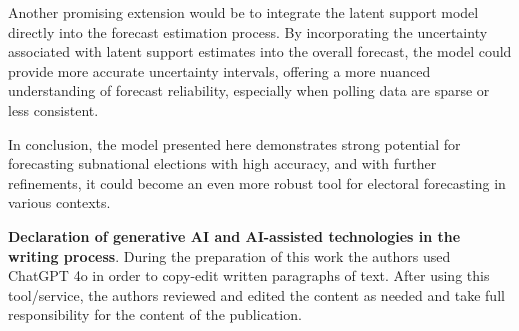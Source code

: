 \documentclass[doublespaced,12pt]{article}
\begin{document}
\begin{doublespacing}
Another promising extension would be to integrate the latent support model directly into the forecast estimation process. By incorporating the uncertainty associated with latent support estimates into the overall forecast, the model could provide more accurate uncertainty intervals, offering a more nuanced understanding of forecast reliability, especially when polling data are sparse or less consistent. 

In conclusion, the model presented here demonstrates strong potential for forecasting subnational elections with high accuracy, and with further refinements, it could become an even more robust tool for electoral forecasting in various contexts.




\end{doublespacing}





\newpage



\clearpage

\newpage
\appendix

\textbf{Declaration of generative AI and AI-assisted technologies in the writing process}. During the preparation of this work the authors used ChatGPT 4o in order to copy-edit written paragraphs of text. After using this tool/service, the authors reviewed and edited the content as needed and take full responsibility for the content of the publication.
\end{document}
